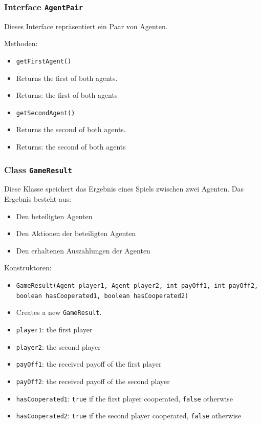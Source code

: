 \documentclass[parskip=full,11pt]{scrartcl}
\begin{document}
\subsubsection{Interface \texttt{AgentPair}}
Dieses Interface repräsentiert ein Paar von Agenten.

Methoden:
\begin{itemize}\itemsep -10pt
\item \texttt{getFirstAgent()}
\item[] Returns the first of both agents.
\item[] Returns: the first of both agents

\item \texttt{getSecondAgent()}
\item[] Returns the second of both agents.
\item[] Returns: the second of both agents
\end{itemize}

\subsubsection{Class \texttt{GameResult}}

Diese Klasse speichert das Ergebnis eines Spiels zwischen zwei Agenten. Das Ergebnis besteht aus:
\begin{itemize}\itemsep -10pt
	\item Den beteiligten Agenten
	\item Den Aktionen der beteiligten Agenten
	\item Den erhaltenen Auszahlungen der Agenten
\end{itemize}
	
Konstruktoren:
\begin{itemize}\itemsep -10pt
\item \texttt{GameResult(Agent player1, Agent player2, int payOff1, int payOff2, boolean hasCooperated1, boolean hasCooperated2)}
\item[] Creates a new \texttt{GameResult}.
\item[] \texttt{player1}: the first player
\item[] \texttt{player2}: the second player
\item[] \texttt{payOff1}: the received payoff of the first player
\item[] \texttt{payOff2}: the received payoff of the second player
\item[] \texttt{hasCooperated1}: \texttt{true} if the first player cooperated, \texttt{false} otherwise
\item[] \texttt{hasCooperated2}: \texttt{true} if the second player cooperated, \texttt{false} otherwise
\end{itemize}
\end{document}
